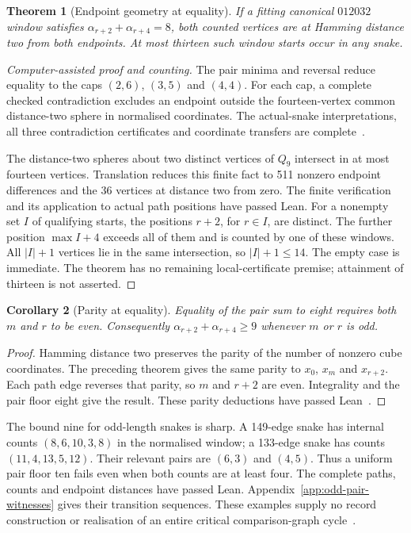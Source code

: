\documentclass[11pt,a4paper]{article}
\newtheorem{theorem}{Theorem}[section]
\newtheorem{corollary}[theorem]{Corollary}
\theoremstyle{definition}
\theoremstyle{remark}
\newcommand{\Q}{Q}
\begin{document}
\begin{theorem}[Endpoint geometry at equality]\label{thm:pair-eight-endpoints}\label{prop:pair-equality-occurrences}
If a fitting canonical $012032$ window satisfies
$\alpha_{r+2}+\alpha_{r+4}=8$, both counted vertices are at Hamming distance
two from both endpoints. At most thirteen such window starts occur in any snake.
\end{theorem}
\begin{proof}[Computer-assisted proof and counting]
The pair minima and reversal reduce equality to the caps $(2,6)$, $(3,5)$
and $(4,4)$. For each cap, a complete checked contradiction excludes an
endpoint outside the fourteen-vertex common distance-two sphere in normalised
coordinates. The actual-snake interpretations, all three contradiction
certificates and coordinate transfers are complete~\cite{endpointcompletionarchive}.

The distance-two spheres about two distinct vertices of $\Q_9$ intersect
in at most fourteen vertices. Translation reduces this finite fact to
511 nonzero endpoint differences and the 36 vertices at distance two from
zero. The finite verification and its application to actual path positions
have passed Lean. For a nonempty set $I$ of qualifying starts, the positions
$r+2$, for $r\in I$, are distinct. The further position $\max I+4$ exceeds
all of them and is counted by one of these windows. All $|I|+1$ vertices
lie in the same intersection, so $|I|+1\le14$. The empty case is immediate.
The theorem has no remaining local-certificate premise; attainment of thirteen
is not asserted.
\end{proof}

\begin{corollary}[Parity at equality]\label{cor:pair-nine-parity}
Equality of the pair sum to eight requires both $m$ and $r$ to be even.
Consequently $\alpha_{r+2}+\alpha_{r+4}\ge9$ whenever $m$ or $r$ is odd.
\end{corollary}
\begin{proof}
Hamming distance two preserves the parity of the number of nonzero cube
coordinates. The preceding theorem gives the same parity to $x_0$, $x_m$
and $x_{r+2}$. Each path edge reverses that parity, so $m$ and $r+2$ are
even. Integrality and the pair floor eight give the result. These parity
deductions have passed Lean~\cite{endpointcompletionarchive}.
\end{proof}

The bound nine for odd-length snakes is sharp. A 149-edge snake has internal
counts $(8,6,10,3,8)$ in the normalised window; a 133-edge snake has counts
$(11,4,13,5,12)$. Their relevant pairs are $(6,3)$ and $(4,5)$. Thus a
uniform pair floor ten fails even when both counts are at least four.
The complete paths, counts and endpoint distances have passed Lean.
Appendix~\ref{app:odd-pair-witnesses} gives their transition sequences.
These examples supply no record construction or realisation of an entire
critical comparison-graph cycle~\cite{oddwitnessarchive}.
\end{document}

